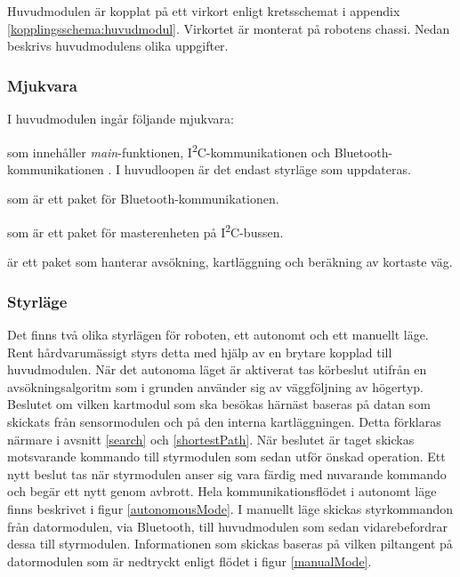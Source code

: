 \documentclass[11pt]{article}
\begin{document}
\begin{flushleft}
Huvudmodulen är kopplat  på ett virkort enligt kretsschemat i appendix \ref{kopplingsschema:huvudmodul}. Virkortet  är monterat på robotens chassi. Nedan beskrivs huvudmodulens olika uppgifter.

\subsubsection{Mjukvara}
I huvudmodulen ingår följande mjukvara:

\begin{description}[style=unboxed, leftmargin=0cm]
  \item[huvudMain.c] som innehåller \textit{main}-funktionen, I\textsuperscript{2}C-kommunikationen och Bluetooth\textsuperscript{\circledR}-kommunikationen . I huvudloopen är det endast styrläge som uppdateras.
  \item[bluetooth.h] som är ett paket för Bluetooth\textsuperscript{\circledR}-kommunikationen.
  \item[I2C\_master.h] som är ett paket för masterenheten på I\textsuperscript{2}C-bussen.
  \item[searchPath.h] är ett paket som hanterar avsökning, kartläggning och beräkning av kortaste väg.
\end{description}

\subsubsection{Styrläge}
Det finns två olika styrlägen för roboten, ett autonomt och ett manuellt läge. Rent hårdvarumässigt styrs detta med hjälp av en brytare kopplad till huvudmodulen. När det autonoma läget är aktiverat tas körbeslut utifrån en avsökningsalgoritm som i grunden använder sig av väggföljning av högertyp. Beslutet om vilken kartmodul som ska besökas härnäst baseras på datan som skickats från sensormodulen och på den interna kartläggningen. Detta förklaras närmare i avsnitt \ref{search} och \ref{shortestPath}. När beslutet är taget skickas motsvarande kommando till styrmodulen som sedan utför önskad operation. Ett nytt beslut tas när styrmodulen anser sig vara färdig med nuvarande kommando och begär ett nytt genom avbrott. Hela kommunikationsflödet i autonomt läge finns beskrivet i figur \ref{autonomousMode}. I manuellt läge skickas styrkommandon från datormodulen, via Bluetooth\textsuperscript{\circledR}, till huvudmodulen som sedan vidarebefordrar dessa till styrmodulen. Informationen som skickas baseras på vilken piltangent på datormodulen som är nedtryckt enligt flödet i figur \ref{manualMode}.


\end{flushleft}
\end{document}
